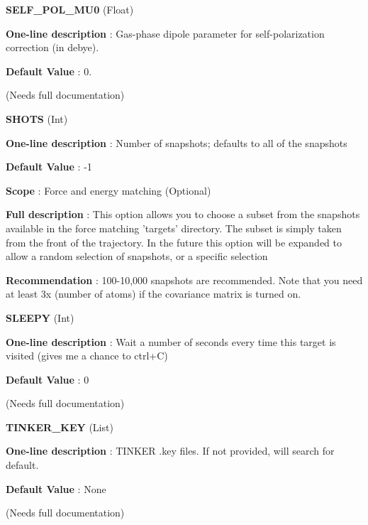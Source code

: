 \begin{DoxyItemize}
\item {\bfseries  \-S\-E\-L\-F\-\_\-\-P\-O\-L\-\_\-\-M\-U0 } (\-Float) \par
{\bfseries  \-One-\/line description }\-: \-Gas-\/phase dipole parameter for self-\/polarization correction (in debye). \par
{\bfseries  \-Default \-Value }\-: 0. \par
(\-Needs full documentation)\end{DoxyItemize}
\begin{DoxyItemize}
\item {\bfseries  \-S\-H\-O\-T\-S } (\-Int) \par
{\bfseries  \-One-\/line description }\-: \-Number of snapshots; defaults to all of the snapshots \par
{\bfseries  \-Default \-Value }\-: -\/1 \par
{\bfseries  \-Scope }\-: \-Force and energy matching (\-Optional) \par
{\bfseries  \-Full description }\-: \-This option allows you to choose a subset from the snapshots available in the force matching 'targets' directory. \-The subset is simply taken from the front of the trajectory. \-In the future this option will be expanded to allow a random selection of snapshots, or a specific selection \par
{\bfseries  \-Recommendation }\-: 100-\/10,000 snapshots are recommended. \-Note that you need at least 3x (number of atoms) if the covariance matrix is turned on.\end{DoxyItemize}
\begin{DoxyItemize}
\item {\bfseries  \-S\-L\-E\-E\-P\-Y } (\-Int) \par
{\bfseries  \-One-\/line description }\-: \-Wait a number of seconds every time this target is visited (gives me a chance to ctrl+\-C) \par
{\bfseries  \-Default \-Value }\-: 0 \par
(\-Needs full documentation)\end{DoxyItemize}
\begin{DoxyItemize}
\item {\bfseries  \-T\-I\-N\-K\-E\-R\-\_\-\-K\-E\-Y } (\-List) \par
{\bfseries  \-One-\/line description }\-: \-T\-I\-N\-K\-E\-R .key files. \-If not provided, will search for default. \par
{\bfseries  \-Default \-Value }\-: \-None \par
(\-Needs full documentation)\end{DoxyItemize}
